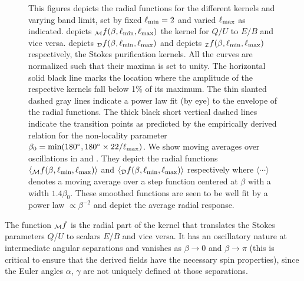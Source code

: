 \begin{figure}[t]
\hfill
{}\hfill
{}\hfill
\centering
{}

\caption{This figures depicts the radial functions for the different kernels and varying band limit, set by fixed $\ell_{\rm min}=2$ and varied $\ell_{\rm max}$ as indicated.  depicts ${_{\mathcal{M}}f}(\beta,\ell_{\rm min},\ell_{\rm max})$ the kernel for $Q/U$ to $E/B$ and vice versa.  depicts ${}_{\mathcal{D}}f(\beta,\ell_{\rm min},\ell_{\rm max})$ and   depicts ${}_{\mathcal{I}}f(\beta,\ell_{\rm min},\ell_{\rm max})$ respectively, the Stokes purification kernels. All the curves are normalized such that their maxima is set to unity. The horizontal solid black line marks the location where the amplitude of the respective kernels fall below 1\% of its maximum. The thin slanted dashed gray lines indicate a power law fit (by eye) to the envelope of the radial functions. The thick black short vertical dashed lines indicate the transition points as predicted by the empirically derived relation for the non-locality parameter $\beta_0={\rm min}(180^\circ,180^\circ \times 22/\ell_{\rm max})$.  We show moving averages over oscillations in  and  .  They depict the radial functions $\langle{_{\mathcal{M}}f}(\beta,\ell_{\rm min},\ell_{\rm max})\rangle$ and $\langle{_{\mathcal{D}}f}(\beta,\ell_{\rm min},\ell_{\rm max})\rangle$ respectively where $\langle \cdots \rangle$ denotes a moving average over a step function centered at $\beta$ with a width $1.4\beta_0$. These smoothed functions are seen to be well fit by a power law $\propto \beta^{-2}$  and depict the average radial response.}
\label{fig:rad_ker_decay}
\end{figure}
%

The function ${_{\mathcal{M}}f}$ is the radial part of the kernel that translates the Stokes parameters $Q$/$U$ to scalars $E$/$B$ and vice versa.  It has an oscillatory nature at intermediate angular separations and vanishes as $\beta \rightarrow 0$ and $\beta \rightarrow \pi$ (this is critical to ensure that the derived fields have the necessary spin properties), since the Euler angles $\alpha$, $\gamma$ are not uniquely defined at those separations.

